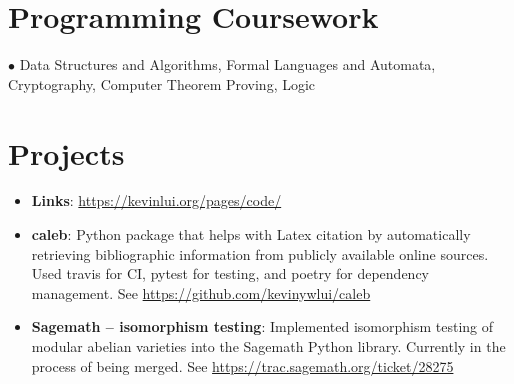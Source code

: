 \documentclass[letterpaper,10pt]{article}
\newcommand{\resumeItem}[2]{
  \item\small{
    \textbf{#1}{: #2 \vspace{-2pt}}
  }
}
\newcommand{\resumeSubItem}[2]{\resumeItem{#1}{#2}\vspace{-4pt}}
\newcommand{\resumeSubHeadingListStart}{\begin{itemize}[leftmargin=*]}
\newcommand{\resumeSubHeadingListEnd}{\end{itemize}}
\begin{document}
\section{Programming Coursework}

$\bullet$ Data Structures and Algorithms, Formal
            Languages and Automata, Cryptography, Computer Theorem Proving, Logic


\section{Projects}
\resumeSubHeadingListStart
\resumeSubItem{Links}{\url{https://kevinlui.org/pages/code/}}
\resumeSubItem{caleb}{Python package that helps with Latex citation by
automatically retrieving bibliographic information from publicly available
online sources. Used travis for CI, pytest for testing, and poetry for
dependency management. See \url{https://github.com/kevinywlui/caleb}}
\resumeSubItem{Sagemath -- isomorphism testing}{Implemented isomorphism testing of
modular abelian varieties into the Sagemath Python library. Currently in the
process of being merged. See \url{https://trac.sagemath.org/ticket/28275}}

\resumeSubHeadingListEnd

\end{document}

